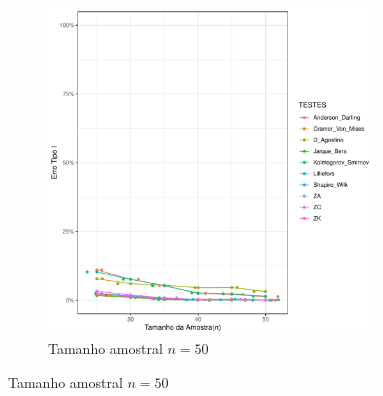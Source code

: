 \documentclass[a4paper,11pt]{article} %
\begin{document}
\begin{figure}[H]
\begin{subfigure}[b]{0.45\textwidth}
        \includegraphics[width=0.95\textwidth]{Distribuição Cauchy/Erro Tipo I/erro_tipo_I_cauchy_50.pdf}
        \caption{Tamanho amostral \(n = 50\)}
        \label{fig:cauchy_50}
    \end{subfigure}
    

\end{figure}
\end{document}
